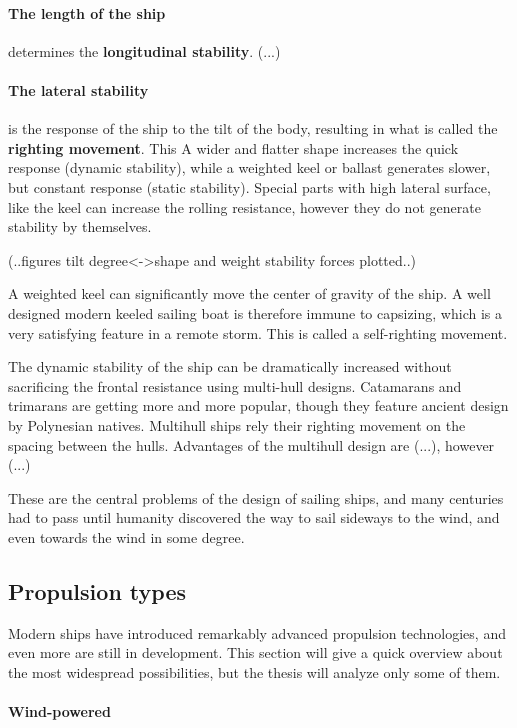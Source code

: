  
\paragraph{The length of the ship} determines the \textbf{longitudinal stability}. (...)

\paragraph{The lateral stability} is the response of the ship to the tilt of the body, resulting in what is called the \textbf{righting movement}. This A wider and flatter shape increases the quick response (dynamic stability), while a weighted keel or ballast generates slower, but constant response (static stability). Special parts with high lateral surface, like the keel can increase the rolling resistance, however they do not generate stability by themselves.

(..figures tilt degree<->shape and weight stability forces plotted..)


A weighted keel can significantly move the center of gravity of the ship. A well designed modern keeled sailing boat is therefore immune to capsizing, which is a very satisfying feature in a remote storm. This is called a self-righting movement.

The dynamic stability of the ship can be dramatically increased without sacrificing the frontal resistance using multi-hull designs. Catamarans and trimarans are getting more and more popular, though they feature ancient design by Polynesian natives. Multihull ships rely their righting movement on the spacing between the hulls.
Advantages of the multihull design are (...), however (...)


These are the central problems of the design of sailing ships, and many centuries had to pass until humanity discovered the way to sail sideways to the wind, and even towards the wind in some degree.

\subsection{Propulsion types}

Modern ships have introduced remarkably advanced propulsion technologies, and even more are still in development. This section will give a quick overview about the most widespread possibilities, but the thesis will analyze only some of them.

\paragraph{Wind-powered}

